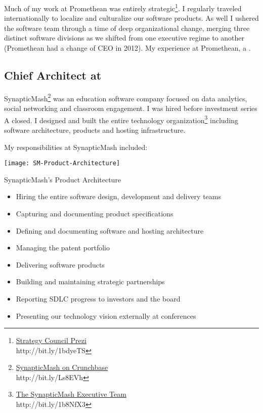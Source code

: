 Much of my work at Promethean was entirely strategic\footnote{\href{http://prezi.com/v-jhcxlibwka/?utm_campaign=share&utm_medium=copy&rc=ex0share}{Strategy Council Prezi}\\ http://bit.ly/1bdyeTS}.  I regularly traveled internationally to localize and culturalize our software products.  As well I ushered the software team through a time of deep organizational change, merging three distinct software divisions as we shifted from one executive regime to another (Promethean had a change of CEO in 2012).  My experience at Promethean, a .

\subsection{\textbf{Chief Architect} at  \shyears{[2008-2010]}}
SynapticMash\footnote{\href{http://www.crunchbase.com/company/synapticmash}{SynapticMash on Crunchbase}\\ http://bit.ly/Ls8EVh} was an education software company focused on data analytics, social networking and classroom engagement.  I was hired before investment series A closed.  I designed and built the entire technology organization\footnote{\href{http://synapticmash.com/index.php/about}{The SynapticMash Executive Team}\\ http://bit.ly/1b8NfX3} including software architecture, products and hosting infrastructure.

My responsibilities at SynapticMash included:
\begin{marginfigure}%
  \texttt{[image: SM-Product-Architecture]}
  \caption{SynapticMash's Product Architecture}
  \label{fig:OpusSite}
\end{marginfigure}
\begin{itemize}
\itemsep-0.5em
\item{Hiring the entire software design, development and delivery teams}
\item{Capturing and documenting product specifications}
\item{Defining and documenting software and hosting architecture}
\item{Managing the patent portfolio}
\item{Delivering software products}
\item{Building and maintaining strategic partnerships}
\item{Reporting SDLC progress to investors and the board}
\item{Presenting our technology vision externally at conferences}
\end{itemize}

